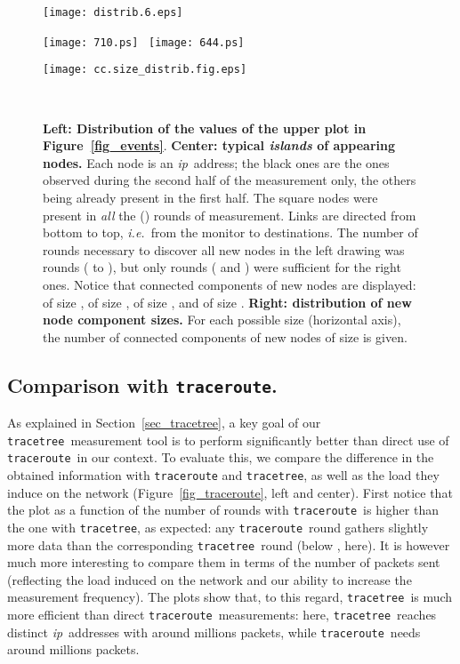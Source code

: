 \documentclass[times, 10pt,twocolumn]{article}
\newcommand{\myscale}{0.48}
\newcommand{\axes}[3]{\mbox{ }\hfill \scalebox{0.7}{\em #1} 
  \hfill \mbox{ } \hfill \scalebox{0.7}{\em #2} 
  \hfill \mbox{ } \hfill \scalebox{0.7}{\em #3} \hfill \mbox{ } \vskip -0.2cm}
\newcommand{\ie}{{\em i.e.}}
\newcommand{\traceroute}{{\tt trace\-route}}
\newcommand{\tracetree}{{\tt trace\-tree}}
\newcommand{\ip}{\mbox{\em \sc ip}}
\begin{document}
\begin{figure*}[!ht]
\begin{minipage}[c]{0.35\linewidth}
\texttt{[image: distrib.6.eps]}
\end{minipage} 
\begin{minipage}[c]{0.25\linewidth}
\texttt{[image: 710.ps]}~
\texttt{[image: 644.ps]}
\end{minipage} 
\begin{minipage}[c]{0.30\linewidth}
\texttt{[image: cc.size\_distrib.fig.eps]}
\end{minipage} 


\axes{\hspace{1cm} = \# ip ;  = \# series}{\hspace{0cm}}{ = components size;  = \# components \hspace{-1cm}}
\caption{
{\bf Left: Distribution of the values of the upper plot in Figure~\ref{fig_events}}.
{\bf Center: typical {\em islands} of appearing nodes.} Each node is an \ip\ address; the black ones are the ones observed during the second half of the measurement only, the others being already present in the first half.
The square nodes were present in {\em all} the () rounds of measurement. Links are directed from bottom to top, \ie\ from the monitor to destinations. The number of rounds necessary to discover all  new nodes in the left drawing was  rounds ( to ), but only  rounds ( and ) were sufficient for the  right ones. Notice that  connected components of new nodes are displayed:  of size ,  of size ,  of size , and  of size .
{\bf Right: distribution of new node component sizes.} For each possible size  (horizontal axis), the number of connected components of new nodes of size  is given.
}
\label{fig_cc}
\end{figure*}

\subsection{Comparison with \traceroute.}
\label{sec_traceroute}

As explained in Section~\ref{sec_tracetree}, a key goal of our
\tracetree\ measurement tool is to perform significantly better than
direct use of \traceroute\ in our context.
To evaluate this, we compare the difference in the obtained information
with \traceroute{} and \tracetree{}, 
as well as the load they induce on the network (Figure~\ref{fig_traceroute}, left and center).
First notice that the plot as a function of the number of rounds with \traceroute\ is higher than the one with \tracetree, as expected: any \traceroute\ round gathers slightly more data than the corresponding \tracetree\ round (below , here).
It is however much more interesting to compare them in terms of the number of packets sent (reflecting the load induced on the network and our ability to increase the measurement frequency). The plots show that, to this regard, \tracetree\ is much more efficient than direct \traceroute\ measurements: here, \tracetree\ reaches  distinct \ip\ addresses with around  millions packets, while \traceroute\ needs around  millions packets.
\end{document}

